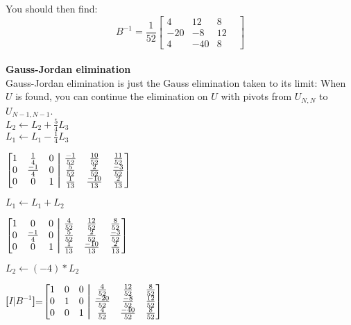 \documentclass[12pt]{article}
\newcommand\aug{\fboxsep=-\fboxrule\!\!\!\fbox{\strut}\!\!\!}
\begin{document}
You should then find: \\

$$B^{-1} = \frac{1}{52}
\begin{bmatrix}
4 & 12 & 8 & \\
-20 & -8 & 12 \\
4 & -40 & 8
\end{bmatrix}$$ \\

\noindent \textbf{Gauss-Jordan elimination} \\
Gauss-Jordan elimination is just the Gauss elimination taken to its limit: When $U$ is found, you can continue the elimination on $U$ with pivots from $U_{N, N}$ to $U_{N-1, N-1}$.\\

\noindent $L_2 \gets L_2 + \frac{5}{4}L_3$ \\
$L_1 \gets L_1 - \frac{1}{4}L_3$ \\
\begin{center}
$\begin{bmatrix}
1 & \frac{1}{4} & 0 & \aug & \frac{-1}{52} & \frac{10}{52} & \frac{11}{52} \\
0 & \frac{-1}{4} & 0 & \aug & \frac{5}{52} & \frac{2}{52} & \frac{-3}{52} \\
0 & 0 & 1 & \aug & \frac{1}{13} & \frac{-10}{13} & \frac{2}{13} \\
\end{bmatrix}$
\end{center}

\noindent $L_1 \gets L_1 + L_2$ \\
\begin{center}
$\begin{bmatrix}
1 & 0 & 0 & \aug & \frac{4}{52} & \frac{12}{52} & \frac{8}{52} \\
0 & \frac{-1}{4} & 0 & \aug & \frac{5}{52} & \frac{2}{52} & \frac{-3}{52} \\
0 & 0 & 1 & \aug & \frac{1}{13} & \frac{-10}{13} & \frac{2}{13} \\
\end{bmatrix}$
\end{center}

\noindent $L_2 \gets (-4)*L_2$ \\
\begin{center}
\textbf{[$I \vert B^{-1}$]}=$\begin{bmatrix}
1 & 0 & 0 & \aug & \frac{4}{52} & \frac{12}{52} & \frac{8}{52} \\
0 & 1 & 0 & \aug & \frac{-20}{52} & \frac{-8}{52} & \frac{12}{52} \\
0 & 0 & 1 & \aug & \frac{4}{52} & \frac{-40}{52} & \frac{8}{52} \\
\end{bmatrix}$
\end{center}
\end{document}
